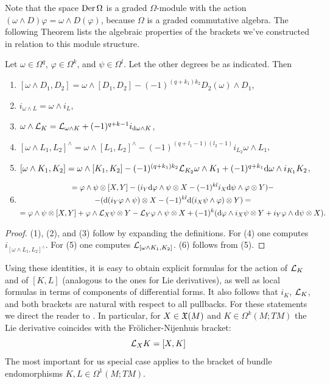 Note that the space $\operatorname{Der} \Omega$ is a graded $\Omega$-module with the action $(\omega\wedge D)\varphi=\omega\wedge D(\varphi)$, because $\Omega$ is a graded commutative algebra. The following Theorem lists the algebraic properties of the brackets we've constructed in relation to this module structure.

\begin{thm}
    Let $\omega\in\Omega^q$, $\varphi\in\Omega^k$, and $\psi\in\Omega^l$. Let the other degrees be as indicated. Then 
    \begin{enumerate}[label=(\arabic*)]
        \item $[\omega\wedge D_1,D_2]=\omega\wedge [D_1,D_2]-(-1)^{(q+k_1)k_2}D_2(\omega)\wedge D_1$,
        \item $i_{\omega\wedge L}=\omega\wedge i_L$,
        \item $\omega\wedge\mathcal{L}_K=\mathcal{L}_{\omega\wedge K}+(-1)^{q+k-1}i_{{\mathrm{d}}\omega\wedge K}$,
        \item $[\omega\wedge L_1,L_2]^{\wedge}=\omega\wedge [L_1,L_2]^{\wedge}-(-1)^{(q+l_1-1)(l_2-1)}i_{L_2}\omega\wedge L_1$,
        \item $[\omega\wedge K_1,K_2]=\omega\wedge [K_1,K_2]-(-1)^{(q+k_1)k_2}\mathcal{L}_{K_2}\omega\wedge K_1+(-1)^{q+k_1}{\mathrm{d}}\omega\wedge i_{K_1}K_2$,
        \item \begin{multline}
            [\varphi\otimes X,\psi\otimes Y]=\varphi\wedge \psi\otimes[X,Y]
            -(i_Y\dd\varphi\wedge\psi\otimes X-(-1)^{kl}i_X\dd\psi\wedge\varphi\otimes Y)-\\
            -(\dd(i_Y\varphi\wedge\psi)\otimes X-(-1)^{kl}\dd(i_X\psi\wedge\varphi)\otimes Y)=\\
            =\varphi\wedge\psi\otimes [X,Y]+\varphi\wedge \Lie_X\psi\otimes Y-\Lie_Y\varphi\wedge\psi\otimes X+(-1)^{k}(\dd\varphi\wedge i_X\psi\otimes Y+i_Y\varphi\wedge\dd\psi\otimes X).
        \end{multline}
    \end{enumerate}
\end{thm}
\begin{proof}
    (1), (2), and (3) follow by expanding the definitions. For (4) one computes $i_{[\omega\wedge L_1,L_2]^{\wedge}}$. For (5) one computes $\mathcal{L}_{[\omega\wedge K_1,K_2]}$. (6) follows from (5).
\end{proof}

Using these identities, it is easy to obtain explicit formulas for the action of $\mathcal{L}_K$ and of $[K,L]$ (analogous to the ones for Lie derivatives), as well as local formulas in terms of components of differential forms. It also follows that $i_K$, $\mathcal{L}_K$, and both brackets are natural with respect to all pullbacks. For these statements we direct the reader to \cite[\S8]{Kolar}. In particular, for $X\in\mathfrak{X}(M)$ and $K\in\Omega^k(M;TM)$ the Lie derivative coincides with the Fr\"olicher-Nijenhuis bracket:
\[\mathcal{L}_X K=[X,K]\]
The most important for us special case applies to the bracket of bundle endomorphisms $K,L\in\Omega^1(M;TM)$.

